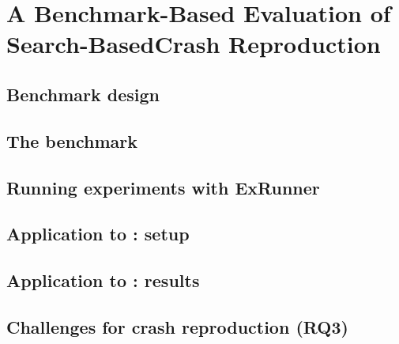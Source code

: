 \chapter{A Benchmark-Based Evaluation of Search-BasedCrash Reproduction}

\label{sec:jcrashpack:introduction}




% 

\section{Benchmark design}
\label{sec:jcrashpack:benchmarkdesign}


\section{The \crashpack benchmark}
\label{sec:jcrashpack:benchmark}


\section{Running experiments with ExRunner}
\label{sec:jcrashpack:ExRunner}


\section{Application to \evocrash: setup}
\label{sec:jcrashpack:evocrashevalsetup}


\section{Application to \evocrash: results}
\label{sec:jcrashpack:evocrashevalresults}


\section{Challenges for crash reproduction (RQ3)}
\label{sec:jcrashpack:challenges}


